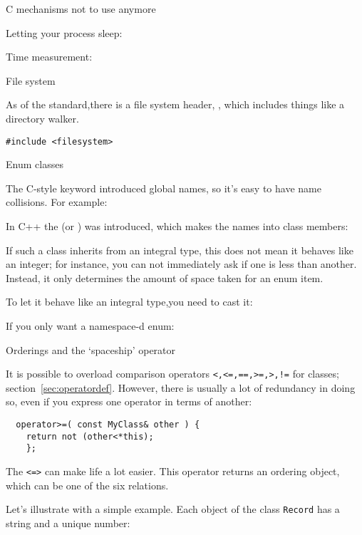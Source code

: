  {C mechanisms not to use anymore}

Letting your process sleep: 

Time measurement: 


 {File system}

As of the  standard,there is a file system header,
,
which includes things like a directory walker.
\begin{lstlisting}
#include <filesystem>
\end{lstlisting}

 {Enum classes}
\label{sec:enum-class}

The C-style  keyword introduced global names, so
it's easy to have name collisions.
For example:

In C++ the 
(or )
was introduced, which makes the names into class members:

If such a class inherits from an integral type,
this does not mean it behaves like an integer;
for instance, you can not immediately ask if one is less than another.
Instead, it only determines the amount of space taken for an enum item.

To let it behave like an integral type,you need to cast it:

If you only want a namespace-d enum:


 {Orderings and the `spaceship' operator}
\label{sec:spaceship}

It is possible to overload comparison operators
\lstinline|<,<=,==,>=,>,!=|
for classes; section~\ref{sec:operatordef}.
However, there is usually a lot of redundancy in doing so,
even if you express one operator in terms of another:
\begin{lstlisting}
  operator>=( const MyClass& other ) {
    return not (other<*this);
    };
\end{lstlisting}

The  
\lstinline|<=>|
can make life a lot easier.
This operator returns an ordering object,
which can be one of the six relations.

Let's illustrate with a simple example.
Each object of the class \lstinline{Record}
has a string and a unique number:

